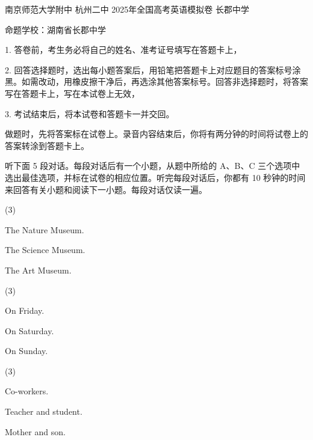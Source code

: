 \documentclass{英语试卷}
\begin{document}
\par 南京师范大学附中 杭州二中 2025年全国高考英语模拟卷 长郡中学\par
\par 命题学校：湖南省长郡中学\par
\begin{notice}
\par 1. 答卷前，考生务必将自己的姓名、准考证号填写在答题卡上，\par
\par 2. 回答选择题时，选出每小题答案后，用铅笔把答题卡上对应题目的答案标号涂黑。如需改动，用橡皮擦干净后，再选涂其他答案标号。回答非选择题时，将答案写在答题卡上，写在本试卷上无效，\par
\par 3. 考试结束后，将本试卷和答题卡一并交回。\par
\end{notice}
\par 做题时，先将答案标在试卷上。录音内容结束后，你将有两分钟的时间将试卷上的答案转涂到答题卡上。\par
{}
\par 听下面 5 段对话。每段对话后有一个小题，从题中所给的 A、B、C 三个选项中选出最佳选项，并标在试卷的相应位置。听完每段对话后，你都有 10 秒钟的时间来回答有关小题和阅读下一小题。每段对话仅读一遍。\par
{}
\begin{choices}(3)
  \item The Nature Museum.
  \item The Science Museum.
  \item The Art Museum.
\end{choices}
\begin{choices}(3)
  \item On Friday.
  \item On Saturday.
  \item On Sunday.
\end{choices}
\begin{choices}(3)
  \item Co-workers.
  \item Teacher and student.
  \item Mother and son.
\end{choices}
\end{document}
